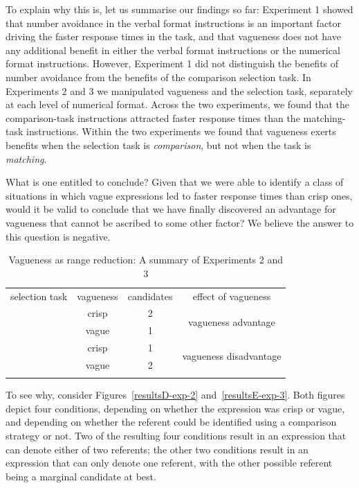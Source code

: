 \documentclass[ %
  graybox       %
 ,envcountchap  %
 ,sectrefs      %
]{svmono}
\begin{document}
To explain why this is, let us summarise our findings so far: Experiment 1 showed that number avoidance in the verbal format instructions is an important factor driving the faster response times in the task, and that vagueness does not have any additional benefit in either the verbal format instructions or the numerical format instructions. However, Experiment 1 did not distinguish the benefits of number avoidance from the benefits of the comparison selection task. In Experiments 2 and 3 we manipulated vagueness and the selection task, separately at each level of numerical format. Across the two experiments, we found that the comparison-task instructions attracted faster response times than the matching-task instructions. Within the two experiments we found that vagueness exerts benefits when the selection task is \emph{comparison}, but not when the task is \emph{matching}.

What is one entitled to conclude? Given that we were able to identify a class of situations in which vague expressions led to faster response times than crisp ones, would it be valid to conclude that we have finally discovered an advantage for vagueness that cannot be ascribed to some other factor? We believe the answer to this question is negative.

\begin{table}[htbp]
\caption{Vagueness as range reduction: A summary of Experiments 2 and 3}
\label{Vagueness as range reduction}
\centering
\begin{tabular}{cccc}
\hline\noalign{\smallskip}
selection task 					& vagueness		& candidates	& effect of vagueness						\\
\noalign{\smallskip}\hline\noalign{\smallskip}
\multirow{ 2}{*}{comparison} 	& crisp 		& 2				& \multirow{ 2}{*}{vagueness advantage}  	\\
\noalign{\smallskip}\cline{2-3}\noalign{\smallskip}
								& vague			& 1				&                                           \\
\noalign{\smallskip}\hline\noalign{\smallskip}
\multirow{ 2}{*}{matching} 		& crisp 		& 1 			& \multirow{ 2}{*}{vagueness disadvantage}	\\
\noalign{\smallskip}\cline{2-3}\noalign{\smallskip}
								& vague			& 2				&								 			\\
\noalign{\smallskip}\hline
\end{tabular}
\end{table}

To see why, consider Figures~\ref{resultsD-exp-2} and~\ref{resultsE-exp-3}. Both figures depict four conditions, depending on whether the expression was crisp or vague, and depending on whether the referent could be identified using a comparison strategy or not. Two of the resulting four conditions result in an expression that can denote either of two referents; the other two conditions result in an expression that can only denote one referent, with the other possible referent being a marginal candidate at best.
\end{document}
